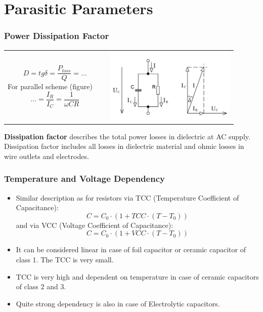 \documentclass{beamer}
\begin{document}
\section{\texorpdfstring{Parasitic Parameters}{Parasitic Parameters}}
	\begin{frame}
    \frametitle{Power Dissipation Factor}
		\begin{center}
		\small
		\begin{tabular}{m{0.4\linewidth} m{0.5\linewidth}}
		$$D=tg\delta=\frac{P_{loss}}{Q}=...$$
		For parallel scheme (figure)
		$$...=\frac{I_R}{I_C}= \frac{1}{\omega CR}$$
		& \includegraphics[scale=0.2]{obr16_tgDelta.png}
		\end{tabular}
		\end{center}
		\begin{flushleft}
			\textbf{Dissipation factor} describes the total power losses in dielectric at AC supply. Dissipation factor includes all losses in dielectric material and ohmic losses in wire outlets and electrodes.
		\end{flushleft}
  \end{frame}
	\begin{frame}
    \frametitle{Temperature and Voltage Dependency}
		\small
		\begin{itemize}
			\item Similar description as for resistors via TCC (Temperature Coefficient of Capacitance): $$C= C_0\cdot\left(1+TCC\cdot(T-T_0)\right)$$ and via VCC (Voltage Coefficient of Capacitance): $$C= C_0\cdot\left(1+VCC\cdot(T-T_0)\right)$$
			\item It can be considered linear in case of foil capacitor or ceramic capacitor of class 1. The TCC is very small.
			\item TCC is very high and dependent on temperature in case of ceramic capacitors of class 2 and 3.
			\item Quite strong dependency is also in case of Electrolytic capacitors.
		\end{itemize}
  \end{frame}
\end{document}
